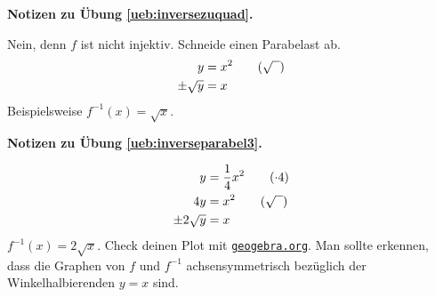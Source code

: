 \documentclass[%
11pt,%
twoside,%
titlepage,%
german,%
headsepline%
]{scrartcl}
\newcommand{\geogebralink}{\href{https://www.geogebra.org/calculator}{\texttt{geogebra.org}}}
\newcommand{\concatueb}[1]{ueb:#1}%
\newcommand{\concatlsg}[1]{lsg:#1}%
\newenvironment{lsg}[1]{%
    \par\noindent\textbf{Notizen zu Übung \ref{\concatueb{#1}}.}%
    \label{\concatlsg{#1}}
}{%
    \par%
}
\begin{document}
\begin{lsg}	{inversezuquad}
Nein, denn $f$ ist nicht injektiv. Schneide einen Parabelast ab.
\begin{align*}
y &= x^2\tag{$\sqrt{\phantom{x}}$}\\
\pm\sqrt{y} &= x
\end{align*}
Beispielsweise $f^{-1}(x)=\sqrt{x}$.
\end{lsg}
\begin{lsg}{inverseparabel3}
\begin{align*}
y&=\frac{1}{4}x^2\tag{$\cdot 4$}\\
4y&=x^2\tag{$\sqrt{\phantom{x}}$}\\
\pm2\sqrt{y} &=x\notag
\end{align*}
$f^{-1}(x)=2\sqrt{x}$. Check deinen Plot mit \geogebralink. Man sollte erkennen, dass die Graphen von $f$ und $f^{-1}$ achsensymmetrisch bezüglich der Winkelhalbierenden $y=x$ sind.
\end{lsg}
\end{document}
